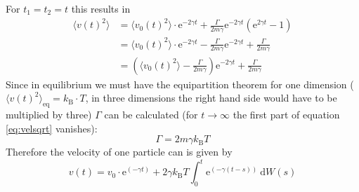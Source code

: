 \documentclass[12pt,a4paper]{scrartcl}
\begin{document}
For $t_1=t_2=t$ this results in
\begin{align}
	\langle v(t)^2\rangle &= \langle v_0(t)^2\rangle \cdot \text{e}^{-2\gamma t}+ \frac{\Gamma}{2 m\gamma} \text{e}^ {-2\gamma t}\left( \text{e}^ {2\gamma t} - 1 \right)\\
	&=\langle v_0(t)^2\rangle \cdot \text{e}^{-2\gamma t} - \frac{\Gamma}{2 m\gamma} \text{e}^ {-2\gamma t} + \frac{\Gamma}{2 m\gamma}\\
	&=\left( \langle v_0(t)^2\rangle - \frac{\Gamma}{2 m\gamma} \right) \text{e}^ {-2\gamma t} + \frac{\Gamma}{2 m\gamma} \label{eq:velsqrt}
\end{align}
Since in equilibrium we must have the equipartition theorem for one dimension ($\langle v(t)^2\rangle_{\text{eq}} = k_\text{B} \cdot T$, in three dimensions the right hand side would have to be multiplied by three) $\Gamma$ can be calculated (for $t \rightarrow \infty$ the first part of equation \ref{eq:velsqrt} vanishes):
\begin{equation}
	\Gamma = 2 m\gamma k_\text{B} T
\end{equation}
Therefore the velocity of one particle can is given by
\begin{equation}
	v(t) = v_0 \cdot \text{e}^{(-\gamma t)} + 2\gamma k_\text{B} T \int_0^t \text{e}^ {(-\gamma(t-s))}~\text{d}W(s)
\end{equation}
\end{document}
